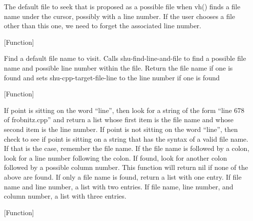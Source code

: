 \begin{doc-string}
The default file to seek that is proposed as a possible file when vh() finds a
file name under the cursor, possibly with a line number.  If the user chooses a
file other than this one, we need to forget the associated line number.
\end{doc-string}

\vspace{1em}
\noindent
{}
\usebox{\funcname}
 \hfill [Function]

\begin{doc-string}
Find a default file name to visit.  Calls shu-find-line-and-file to find a possible file
name and possible line number within the file.  Return the file name if one is found and
sets shu-cpp-target-file-line to the line number if one is found
\end{doc-string}

\vspace{1em}
\noindent
{}
\usebox{\funcname}
 \hfill [Function]

\begin{doc-string}
If point is sitting on the word ``line'', then look for a string of the form
``line 678 of frobnitz.cpp'' and return a list whose first item is the file name
and whose second item is the line number.  If point is not sitting on the word ``line'',
then check to see if point is sitting on a string that has the syntax of a valid
file name.  If that is the case, remember the file name.  If the file name is
followed by a colon, look for a line number following the colon.  If found, look
for another colon followed by a possible column number.  This function will return
nil if none of the above are found.  If only a file name is found, return a list
with one entry.  If file name and line number, a list with two entries.  If file
name, line number, and column number, a list with three entries.
\end{doc-string}

\vspace{1em}
\noindent
{}
\usebox{\funcname}
 \hfill [Function]


